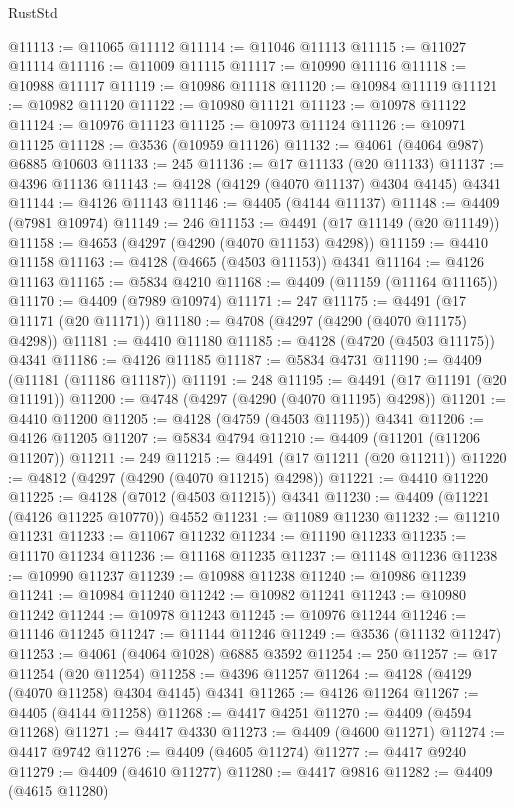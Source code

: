 \begin{lexlean}{RustStd}
\begin{coremodule}
@11113 := @11065 @11112
@11114 := @11046 @11113
@11115 := @11027 @11114
@11116 := @11009 @11115
@11117 := @10990 @11116
@11118 := @10988 @11117
@11119 := @10986 @11118
@11120 := @10984 @11119
@11121 := @10982 @11120
@11122 := @10980 @11121
@11123 := @10978 @11122
@11124 := @10976 @11123
@11125 := @10973 @11124
@11126 := @10971 @11125
@11128 := @3536 (@10959 @11126)
@11132 := @4061 (@4064 @987) @6885 @10603
@11133 := 245
@11136 := @17 @11133 (@20 @11133)
@11137 := @4396 @11136
@11143 := @4128 (@4129 (@4070 @11137) @4304 @4145) @4341
@11144 := @4126 @11143
@11146 := @4405 (@4144 @11137)
@11148 := @4409 (@7981 @10974)
@11149 := 246
@11153 := @4491 (@17 @11149 (@20 @11149))
@11158 := @4653 (@4297 (@4290 (@4070 @11153) @4298))
@11159 := @4410 @11158
@11163 := @4128 (@4665 (@4503 @11153)) @4341
@11164 := @4126 @11163
@11165 := @5834 @4210
@11168 := @4409 (@11159 (@11164 @11165))
@11170 := @4409 (@7989 @10974)
@11171 := 247
@11175 := @4491 (@17 @11171 (@20 @11171))
@11180 := @4708 (@4297 (@4290 (@4070 @11175) @4298))
@11181 := @4410 @11180
@11185 := @4128 (@4720 (@4503 @11175)) @4341
@11186 := @4126 @11185
@11187 := @5834 @4731
@11190 := @4409 (@11181 (@11186 @11187))
@11191 := 248
@11195 := @4491 (@17 @11191 (@20 @11191))
@11200 := @4748 (@4297 (@4290 (@4070 @11195) @4298))
@11201 := @4410 @11200
@11205 := @4128 (@4759 (@4503 @11195)) @4341
@11206 := @4126 @11205
@11207 := @5834 @4794
@11210 := @4409 (@11201 (@11206 @11207))
@11211 := 249
@11215 := @4491 (@17 @11211 (@20 @11211))
@11220 := @4812 (@4297 (@4290 (@4070 @11215) @4298))
@11221 := @4410 @11220
@11225 := @4128 (@7012 (@4503 @11215)) @4341
@11230 := @4409 (@11221 (@4126 @11225 @10770)) @4552
@11231 := @11089 @11230
@11232 := @11210 @11231
@11233 := @11067 @11232
@11234 := @11190 @11233
@11235 := @11170 @11234
@11236 := @11168 @11235
@11237 := @11148 @11236
@11238 := @10990 @11237
@11239 := @10988 @11238
@11240 := @10986 @11239
@11241 := @10984 @11240
@11242 := @10982 @11241
@11243 := @10980 @11242
@11244 := @10978 @11243
@11245 := @10976 @11244
@11246 := @11146 @11245
@11247 := @11144 @11246
@11249 := @3536 (@11132 @11247)
@11253 := @4061 (@4064 @1028) @6885 @3592
@11254 := 250
@11257 := @17 @11254 (@20 @11254)
@11258 := @4396 @11257
@11264 := @4128 (@4129 (@4070 @11258) @4304 @4145) @4341
@11265 := @4126 @11264
@11267 := @4405 (@4144 @11258)
@11268 := @4417 @4251
@11270 := @4409 (@4594 @11268)
@11271 := @4417 @4330
@11273 := @4409 (@4600 @11271)
@11274 := @4417 @9742
@11276 := @4409 (@4605 @11274)
@11277 := @4417 @9240
@11279 := @4409 (@4610 @11277)
@11280 := @4417 @9816
@11282 := @4409 (@4615 @11280)

\end{coremodule}
\end{lexlean}
